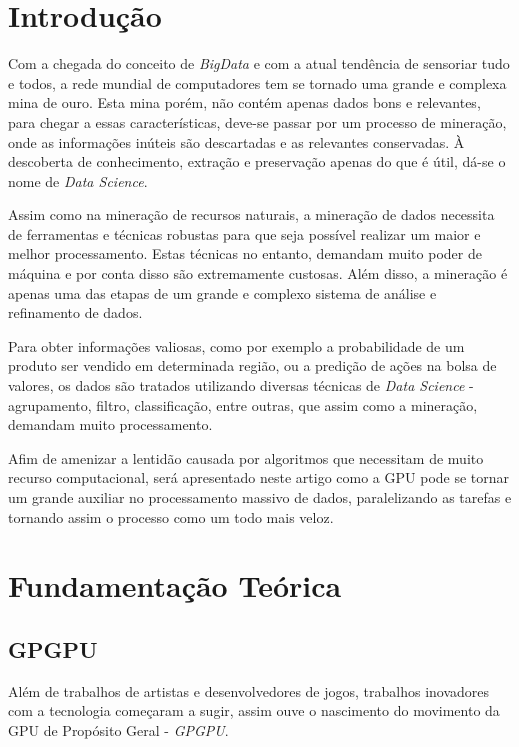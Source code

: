 \documentclass[conference]{IEEEtran}
\begin{document}
	
	
	\IEEEpeerreviewmaketitle
	
	
	\section{Introdução}
	Com a chegada do conceito de \textit{BigData} e com a atual tendência de sensoriar tudo e todos, a rede mundial de computadores tem se tornado uma grande e complexa mina de ouro. Esta mina porém, não contém apenas dados bons e relevantes, para chegar a essas características, deve-se passar por um processo de mineração, onde as informações inúteis são descartadas e as relevantes conservadas. À descoberta de conhecimento, extração e preservação apenas do que é útil, dá-se o nome de \textit{Data Science}.
	
	Assim como na mineração de recursos naturais, a mineração de dados necessita de ferramentas e técnicas robustas para que seja possível realizar um maior e melhor processamento. Estas técnicas no entanto, demandam muito poder de máquina e por conta disso são extremamente custosas. Além disso, a mineração é apenas uma das etapas de um grande e complexo sistema de análise e refinamento de dados.
	
	Para obter informações valiosas, como por exemplo a probabilidade de um produto ser vendido em determinada região, ou a predição de ações na bolsa de valores, os dados são tratados utilizando diversas técnicas de \textit{Data Science} - agrupamento, filtro, classificação, entre outras, que assim como a mineração, demandam muito processamento.
	
	Afim de amenizar a lentidão causada por algoritmos que necessitam de muito recurso computacional, será apresentado neste artigo como a GPU pode se tornar um grande auxiliar no processamento massivo de dados, paralelizando as tarefas e tornando assim o processo como um todo mais veloz.
	
	
	\section{Fundamenta\c{c}\~ao Te\'orica}
	
	
	\subsection{GPGPU}
	
	Al\'em de trabalhos de artistas e desenvolvedores de jogos, trabalhos inovadores com a tecnologia come\c{c}aram a sugir, assim ouve o nascimento do movimento da GPU de Prop\'osito Geral  - \textit{GPGPU}.
	
\end{document}
